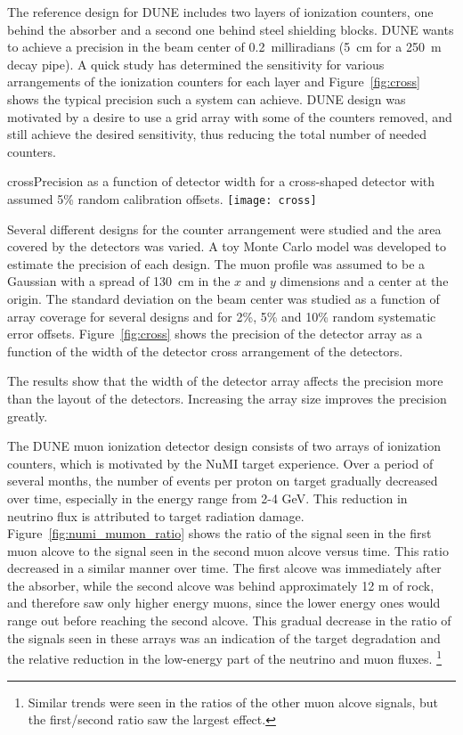 The reference design for DUNE includes two layers of ionization counters, one 
behind the absorber and a second one behind steel shielding blocks. 
DUNE wants to achieve a precision in the beam center of 0.2~milliradians
(5~cm for a 250~m decay pipe). A quick study has 
determined the sensitivity for various arrangements of the ionization counters for each layer and
Figure~\ref{fig:cross} shows the typical precision such a system can achieve.
DUNE design was motivated by a desire to use a grid array with some of the 
counters removed, and still achieve the desired sensitivity, 
thus reducing the total number of needed counters.

\begin{cdrfigure}{cross}{Precision as a function of detector width for a cross-shaped detector 
with assumed 5\% random calibration offsets.}
\texttt{[image: cross]}
\end{cdrfigure}

Several different designs for the counter arrangement were studied and the
area covered by the detectors was varied. A toy Monte Carlo model was
developed to estimate the precision of each design. The muon profile
was assumed to be a Gaussian with a spread of 130~cm in the $x$ and $y$
dimensions and a center at the origin. 
The standard deviation on the beam center was studied as a
function of array coverage for several designs and for 2\%, 5\% and
10\% random systematic error offsets. Figure~\ref{fig:cross} shows the
precision of the detector array as a function of the width of the
detector cross arrangement of the detectors.

The results show that the width of the detector array affects the
precision more than the layout of the detectors. Increasing the array
size improves the precision greatly. 

The DUNE muon ionization detector design consists of two arrays of 
ionization counters, which is motivated by the NuMI target experience.  Over a period of several months, the number of events per proton on target gradually decreased over time, especially in the energy range from 2-4 GeV.  
This reduction in neutrino flux is attributed to 
target radiation damage.  Figure~\ref{fig:numi_mumon_ratio} shows the ratio of the signal seen  in the first muon alcove to the signal seen in the second muon alcove versus time.  This ratio decreased in a similar manner over time.  
The first alcove was immediately after the absorber, while the second alcove was behind approximately 12 m of rock, and therefore saw only higher energy muons, since the lower energy ones would range out before reaching the second alcove.  
This gradual decrease in the ratio of the signals seen in these arrays was an indication of the target degradation and the relative reduction in the 
low-energy part of the neutrino and muon fluxes.  \footnote{Similar trends were seen in the ratios of the other muon alcove signals, but the first/second ratio saw the largest effect.}

